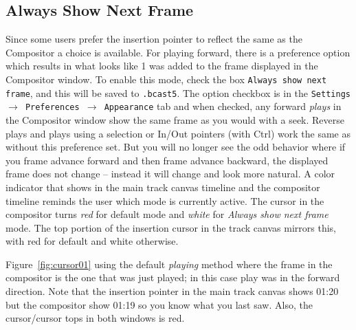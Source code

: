 \subsection{Always Show Next Frame}%
\label{sub:always_show_next_frame}

Since some users prefer the insertion pointer to reflect the same as the Compositor a choice is available.  For playing forward, there is a preference option which results in what looks like 1 was added to the frame displayed in the Compositor window.  To enable this mode, check the box \texttt{Always show next frame}, and this will be saved to \texttt{.bcast5}.  The option checkbox is in the \texttt{Settings $\rightarrow$ Preferences $\rightarrow$ Appearance} tab and when checked, any forward \textit{plays} in the Compositor window show the same frame as you would with a seek.  Reverse plays and plays using a selection or In/Out pointers (with Ctrl) work the same as without this preference set.  But you will no longer see the odd behavior where if you frame advance forward and then frame advance backward, the displayed frame does not change -- instead it will change and look more natural.
A color indicator that shows in the main track canvas timeline and the compositor timeline reminds the user which mode is currently active.  The cursor in the compositor turns \textit{red} for default mode and \textit{white} for \textit{Always show next frame} mode.  The top portion of the insertion cursor in the track canvas mirrors this, with red for default and white otherwise.

Figure~\ref{fig:cursor01} using the default \textit{playing} method where the frame in the compositor is the one that was just played; in this case play was in the forward direction.  Note that the insertion pointer in the main track canvas shows 01:20 but the compositor show 01:19 so you know what you last saw.  Also, the cursor/cursor tops in both windows is red.

